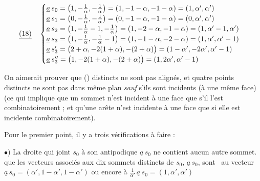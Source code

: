 \documentclass[11pt,a4paper]{article}
\begin{document}
\[ \struck{(18)} \quad \begin{cases}
\underline{a}\, s_0 = \bigl(1, -\frac{1}{\alpha}, -\frac{1}{\alpha}\bigr) = (1, -1-\alpha, -1-\alpha) = (1, \alpha', \alpha') \\
\underline{a}\, s_1 = \bigl(0, -\frac{1}{\alpha}, -\frac{1}{\alpha}\bigr) = (0, -1-\alpha, -1-\alpha) = (0, \alpha', \alpha') \\
\underline{a}\, s_2 = \bigl(1, -\frac{1}{\alpha} - 1, -\frac{1}{\alpha}\bigr) = (1, -2-\alpha, -1-\alpha) = (1, \alpha' - 1, \alpha') \\
\underline{a}\, s_3 = \bigl(1, -\frac{1}{\alpha}, -\frac{1}{\alpha} - 1\bigr) = (1, -1-\alpha, -2-\alpha) = (1, \alpha', \alpha' - 1) \\
\underline{a}\, s'_3 = \bigl(2 + \alpha, -2(1+\alpha), -(2+\alpha)\bigr) = (1 - \alpha', -2\alpha', \alpha' - 1) \\
\underline{a}\, s''_3 = \bigl(1, -2(1+\alpha), -(2+\alpha)\bigr) = (1, 2\alpha', \alpha' - 1)
\end{cases} \]

On aimerait prouver que ()  \struck{\ill{}} distincts  ne sont pas alignés, et quatre points distincts ne sont pas dans   même plan \emph{sauf} s'ils \struck{\ill{}} sont incidents  (à une même face) (ce qui implique que un sommet n'est incident  à une face que s'il \struck{\ill{}} l'est combinatoirement ; et  qu'une arête n'est incidente  à une face que si elle est incidente combinatoirement).

Pour le premier point, il y a trois vérifications à faire :

$\bullet$) La droite qui joint $s_0$ à son antipodique $\underline{a}\,s_0$ ne contient aucun autre sommet.   que les  vecteurs \struck{\ill{}}  associés aux dix sommets distincts de $s_0$, $\underline{a}\,s_0$, sont \ au vecteur  $\underline{a}\,s_0 = (\alpha', 1 - \alpha', 1 - \alpha')$  ou encore à $\frac{1}{\alpha'}\,\underline{a}\,s_0 = (1, \alpha', \alpha')$
\end{document}
